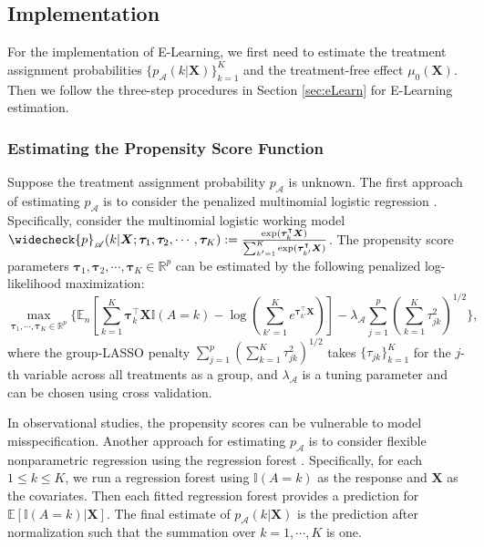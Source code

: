 \documentclass[11pt]{article}
\theoremstyle{definition}
\theoremstyle{remark}
\newcommand{\bX}{\bm{X}}
\newcommand{\btau}{\bm{\tau}}
\newcommand{\bbE}{\mathbb{E}}
\newcommand{\bbI}{\mathbb{I}}
\newcommand{\bbR}{\mathbb{R}}
\newcommand{\sA}{\mathscr{A}}
\newcommand{\bbone}{\bbI}	%
\begin{document}
\subsection{Implementation}\label{sec:implement}
For the implementation of E-Learning, we first need to estimate the treatment assignment probabilities $ \{ p_{\sA}(k|\bX) \}_{k=1}^{K} $ and the treatment-free effect $ \mu_{0}(\bX) $. Then we follow the three-step procedures in Section \ref{sec:eLearn} for E-Learning estimation.

\subsubsection{Estimating the Propensity Score Function}\label{sec:prop}
Suppose the treatment assignment probability $ p_{\sA} $ is unknown. The first approach of estimating $ p_{\sA} $ is to consider the penalized multinomial logistic regression \citep{friedman2010regularization}. Specifically, consider the multinomial logistic working model $ \widecheck{p}_{\sA}(k|\bX;\btau_{1},\btau_{2},\cdots,\btau_{K}) := {\exp(\btau_{k}^{\intercal}\bX) \over \sum_{k'=1}^{K}\exp(\btau_{k'}^{\intercal}\bX)} $. The propensity score parameters $\btau_{1},\btau_{2},\cdots,\btau_{K} \in \bbR^{p} $ can be estimated by the following penalized log-likelihood maximization:
\[ \max_{\btau_{1},\cdots,\btau_{K}\in\bbR^{p}}\Bigg\{ \bbE_{n}\left[  \sum_{k=1}^{K}\btau_{k}^{\intercal}\bX\bbone(A=k) - \log\left(\sum_{k'=1}^{K}e^{\btau_{k'}^{\intercal}\bX}\right)\right] - \lambda_{\sA}\sum_{j=1}^{p}\left( \sum_{k=1}^{K}\tau_{jk}^{2} \right)^{1/2}\Bigg\}, \]
where the group-LASSO penalty $ \sum_{j=1}^{p}\left( \sum_{k=1}^{K}\tau_{jk}^{2} \right)^{1/2} $ takes $\{\tau_{jk}\}_{k=1}^{K}$ for the $j$-th variable across all treatments as a group, and $ \lambda_{\sA} $ is a tuning parameter and can be chosen using cross validation.

In observational studies, the propensity scores can be vulnerable to model misspecification. Another approach for estimating $ p_{\sA} $ is to consider flexible nonparametric regression using the regression forest \citep{athey2019generalized}. Specifically, for each $ 1 \le k \le K $, 	we run a regression forest using $ \bbone(A = k) $ as the response and $ \bX $ as the covariates. Then each fitted regression forest provides a prediction for $ \bbE[\bbone(A=k)|\bX] $. The final estimate of $ p_{\sA}(k|\bX) $ is the prediction after normalization such that the summation over $ k = 1, \cdots, K $ is one.
\end{document}
